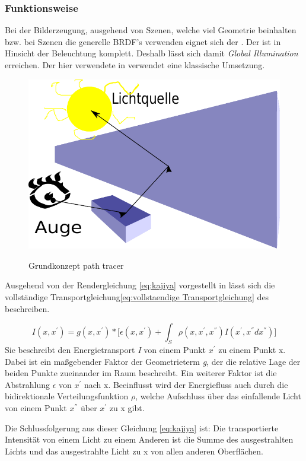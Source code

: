 \subsubsection{Funktionsweise}
Bei der Bilderzeugung, ausgehend von Szenen, welche viel Geometrie beinhalten bzw. bei Szenen 
die generelle BRDF's verwenden eignet sich der .
Der  ist in Hinsicht der Beleuchtung komplett. Deshalb lässt sich damit
\textit{Global Illumination} erreichen. Der hier verwendete  in 
\cite{Benty18} verwendet eine klassische Umsetzung.\par

\begin{figure}[H]
    \centering
    \includegraphics[width=0.7\linewidth]{content/PathTracer/Bilder/Grundkonzept_path_tracing.pdf}
    \label{pic::PathTracingGrundkonzept}
    \caption{Grundkonzept path tracer}
\end{figure}

Ausgehend von der Rendergleichung \ref{eq:kajiya} vorgestellt in \cite{kajiya1986rendering} lässt sich
die vollständige Transportgleichung\ref{eq:vollstaendige Transportgleichung} des 
beschreiben.
 

\begin{equation}\label{eq:kajiya}
        I(x,{x}^{'}) = g(x,{x}^{'}) * \biggl[\epsilon(x,{x}^{'}) + 
                        \int_{S}^{} \rho(x,{x}^{'},{x}^{''})
                        I({x}^{'},{x}^{''}d{x}^{''})\biggr] 
\end{equation}
Sie beschreibt den Energietransport \textit{I} von einem Punkt ${x}^{'}$
zu einem Punkt x. Dabei ist ein maßgebender Faktor der Geometrieterm \textit{g},
der die relative Lage der beiden Punkte zueinander im Raum beschreibt.
Ein weiterer Faktor ist die Abstrahlung \textit{$\epsilon$} von ${x}^{'}$ nach x. 
Beeinflusst wird der Energiefluss auch durch
die bidirektionale Verteilungsfunktion \textit{$\rho$}, welche Aufschluss über
das einfallende Licht von einem Punkt ${x}^{''}$ über ${x}^{'}$ zu x gibt.\par
Die Schlussfolgerung aus dieser Gleichung \ref{eq:kajiya} ist: Die transportierte
Intensität von einem Licht zu einem Anderen ist die Summe des ausgestrahlten Lichts 
und das ausgestrahlte Licht zu x von allen anderen Oberflächen.

